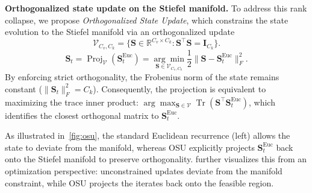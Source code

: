 \noindent
\textbf{Orthogonalized state update on the Stiefel manifold.}
To address this rank collapse, we propose \emph{Orthogonalized State Update}, which constrains the state evolution to the Stiefel manifold via an orthogonalized update
\begin{equation}
    \label{eq:stiefel_manifold}
    \mathcal{V}_{C_v, C_k} = \{\mathbf{S} \in \mathbb{R}^{C_v \times C_k} : \mathbf{S}^\top \mathbf{S} = \mathbf{I}_{C_k}\}.
\end{equation}
\begin{equation}
  \mathbf{S}_t = \operatorname{Proj}_{\mathcal{V}}(\mathbf{S}_t^{\text{Euc}}) = \underset{\mathbf{S} \in \mathcal{V}_{C_v, C_k}}{\arg\min} \frac{1}{2} \|\mathbf{S} - \mathbf{S}_t^{\text{Euc}}\|_F^2.
\end{equation}
By enforcing strict orthogonality, the Frobenius norm of the state remains constant ($\|\mathbf{S}_t\|_F^2 = C_k$).
Consequently, the projection is equivalent to maximizing the trace inner product: $\arg\max_{\mathbf{S} \in \mathcal{V}} \operatorname{Tr}(\mathbf{S}^\top \mathbf{S}_t^{\text{Euc}})$, which identifies the closest orthogonal matrix to $\mathbf{S}_t^{\text{Euc}}$.

        

As illustrated in~\cref{fig:osu}, the standard Euclidean recurrence (left) allows the state to deviate from the manifold, whereas OSU explicitly projects $\mathbf{S}_t^{\text{Euc}}$ back onto the Stiefel manifold to preserve orthogonality.
 further visualizes this from an optimization perspective: unconstrained updates deviate from the manifold constraint, while OSU projects the iterates back onto the feasible region.

